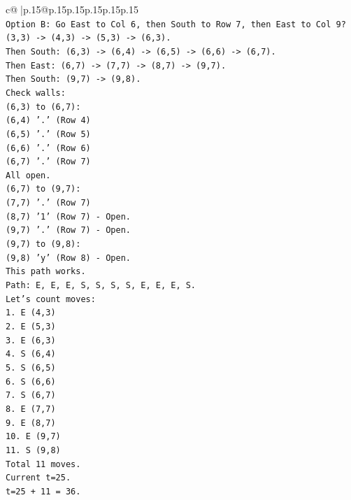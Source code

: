 \documentclass{article}
\begin{document}
{\begin{supertabular}{c@{$\;$}|p{.15\linewidth}@{}p{.15\linewidth}p{.15\linewidth}p{.15\linewidth}p{.15\linewidth}p{.15\linewidth}}
{{{\\ 
\texttt{Option B: Go East to Col 6, then South to Row 7, then East to Col 9?} \\
\texttt{(3,3) {-}> (4,3) {-}> (5,3) {-}> (6,3).} \\
\texttt{Then South: (6,3) {-}> (6,4) {-}> (6,5) {-}> (6,6) {-}> (6,7).} \\
\texttt{Then East: (6,7) {-}> (7,7) {-}> (8,7) {-}> (9,7).} \\
\texttt{Then South: (9,7) {-}> (9,8).} \\
\texttt{Check walls:} \\
\texttt{(6,3) to (6,7):} \\
\texttt{(6,4) '.' (Row 4)} \\
\texttt{(6,5) '.' (Row 5)} \\
\texttt{(6,6) '.' (Row 6)} \\
\texttt{(6,7) '.' (Row 7)} \\
\texttt{All open.} \\
\texttt{(6,7) to (9,7):} \\
\texttt{(7,7) '.' (Row 7)} \\
\texttt{(8,7) '1' (Row 7) {-} Open.} \\
\texttt{(9,7) '.' (Row 7) {-} Open.} \\
\texttt{(9,7) to (9,8):} \\
\texttt{(9,8) 'y' (Row 8) {-} Open.} \\
\texttt{This path works.} \\
\texttt{Path: E, E, E, S, S, S, S, E, E, E, S.} \\
\texttt{Let's count moves:} \\
\texttt{1. E (4,3)} \\
\texttt{2. E (5,3)} \\
\texttt{3. E (6,3)} \\
\texttt{4. S (6,4)} \\
\texttt{5. S (6,5)} \\
\texttt{6. S (6,6)} \\
\texttt{7. S (6,7)} \\
\texttt{8. E (7,7)} \\
\texttt{9. E (8,7)} \\
\texttt{10. E (9,7)} \\
\texttt{11. S (9,8)} \\
\texttt{Total 11 moves.} \\
\texttt{Current t=25.} \\
\texttt{t=25 + 11 = 36.} \\
}}}
\end{supertabular}}
\end{document}
